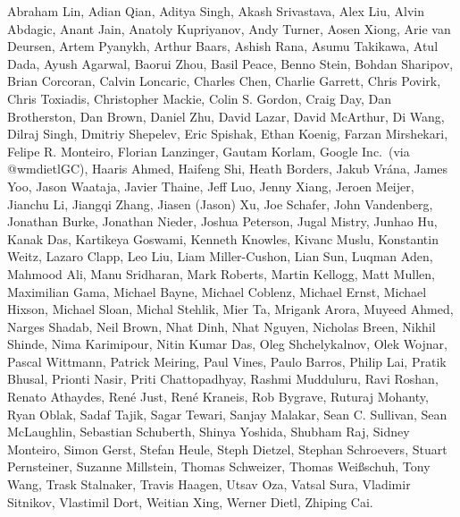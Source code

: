 Abraham Lin,
Adian Qian,
Aditya Singh,
Akash Srivastava,
Alex Liu,
Alvin Abdagic,
Anant Jain,
Anatoly Kupriyanov,
Andy Turner,
Aosen Xiong,
Arie van Deursen,
Artem Pyanykh,
Arthur Baars,
Ashish Rana,
Asumu Takikawa,
Atul Dada,
Ayush Agarwal,
Baorui Zhou,
Basil Peace,
Benno Stein,
Bohdan Sharipov,
Brian Corcoran,
Calvin Loncaric,
Charles Chen,
Charlie Garrett,
Chris Povirk,
Chris Toxiadis,
Christopher Mackie,
Colin S. Gordon,
Craig Day,
Dan Brotherston,
Dan Brown,
Daniel Zhu,
David Lazar,
David McArthur,
Di Wang,
Dilraj Singh,
Dmitriy Shepelev,
Eric Spishak,
Ethan Koenig,
Farzan Mirshekari,
Felipe R. Monteiro,
Florian Lanzinger,
Gautam Korlam,
Google Inc.\ (via @wmdietlGC),
Haaris Ahmed,
Haifeng Shi,
Heath Borders,
Jakub Vr\'ana,
James Yoo,
Jason Waataja,
Javier Thaine,
Jeff Luo,
Jenny Xiang,
Jeroen Meijer,
Jianchu Li,
Jiangqi Zhang,
Jiasen (Jason) Xu,
Joe Schafer,
John Vandenberg,
Jonathan Burke,
Jonathan Nieder,
Joshua Peterson,
Jugal Mistry,
Junhao Hu,
Kanak Das,
Kartikeya Goswami,
Kenneth Knowles,
Kivanc Muslu,
Konstantin Weitz,
Lazaro Clapp,
Leo Liu,
Liam Miller-Cushon,
Lian Sun,
Luqman Aden,
Mahmood Ali,
Manu Sridharan,
Mark Roberts,
Martin Kellogg,
Matt Mullen,
Maximilian Gama,
Michael Bayne,
Michael Coblenz,
Michael Ernst,
Michael Hixson,
Michael Sloan,
Michal Stehlik,
Mier Ta,
Mrigank Arora,
Muyeed Ahmed,
Narges Shadab,
Neil Brown,
Nhat Dinh,
Nhat Nguyen,
Nicholas Breen,
Nikhil Shinde,
Nima Karimipour,
Nitin Kumar Das,
Oleg Shchelykalnov,
Olek Wojnar,
Pascal Wittmann,
Patrick Meiring,
Paul Vines,
Paulo Barros,
Philip Lai,
Pratik Bhusal,
Prionti Nasir,
Priti Chattopadhyay,
Rashmi Mudduluru,
Ravi Roshan,
Renato Athaydes,
Ren\'e Just,
Ren\'e Kraneis,
Rob Bygrave,
Ruturaj Mohanty,
Ryan Oblak,
Sadaf Tajik,
Sagar Tewari,
Sanjay Malakar,
Sean C. Sullivan,
Sean McLaughlin,
Sebastian Schuberth,
Shinya Yoshida,
Shubham Raj,
Sidney Monteiro,
Simon Gerst,
Stefan Heule,
Steph Dietzel,
Stephan Schroevers,
Stuart Pernsteiner,
Suzanne Millstein,
Thomas Schweizer,
Thomas Wei\ss schuh,
Tony Wang,
Trask Stalnaker,
Travis Haagen,
Utsav Oza,
Vatsal Sura,
Vladimir Sitnikov,
Vlastimil Dort,
Weitian Xing,
Werner Dietl,
Zhiping Cai.
